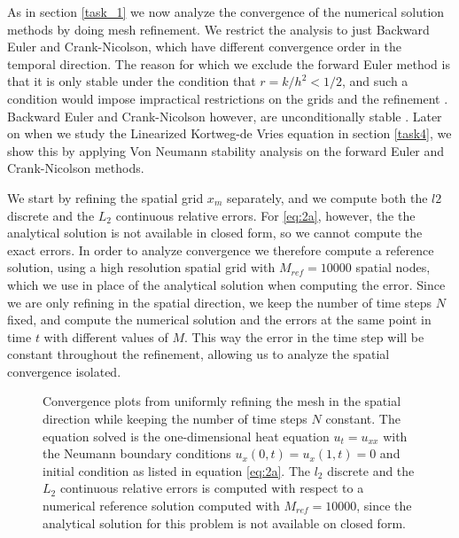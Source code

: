 As in section \ref{task_1} we now analyze the convergence of the numerical solution methods 
by doing mesh refinement. 
We restrict the analysis to just Backward Euler and Crank-Nicolson, 
which have different convergence order in the temporal direction. 
The reason for which we exclude the forward Euler method is that it is only stable under the condition that $r=k/h^2 < 1/2$, 
and such a condition would impose impractical restrictions on the grids and the refinement \cite{owren}. 
Backward Euler and Crank-Nicolson however, are unconditionally stable \cite{owren}. 
Later on when we study the Linearized Kortweg-de Vries equation in section \ref{task4}, 
we show this by applying Von Neumann stability analysis on the forward Euler and Crank-Nicolson methods. 

We start by refining the spatial grid $x_m$ separately, 
and we compute both the $l2$ discrete and the $L_2$ continuous relative errors. 
For \eqref{eq:2a}, however, the the analytical solution is not available in closed form, 
so we cannot compute the exact errors. 
In order to analyze convergence we therefore compute a reference solution, 
using a high resolution spatial grid with $M_{ref}=10000$ spatial nodes, 
which we use in place of the analytical solution when computing the error. 
Since we are only refining in the spatial direction, 
we keep the number of time steps $N$ fixed, 
and compute the numerical solution and the errors at the same point in time $t$ with different values of $M$. 
This way the error in the time step will be constant throughout the refinement, 
allowing us to analyze the spatial convergence isolated. 
\begin{figure}[ht]
    \centering
    
    \caption{
        Convergence plots from uniformly refining the mesh 
        in the spatial direction while keeping the number of time steps $N$ constant. 
        The equation solved is the one-dimensional heat equation $u_t=u_{xx}$ 
        with the Neumann boundary conditions $u_x(0,t) = u_x(1,t)=0$ and initial condition 
        as listed in equation \eqref{eq:2a}. 
        The $l_2$ discrete and the $L_2$ continuous relative errors is computed 
        with respect to a numerical reference solution computed with $M_{ref}=10000$, 
        since the analytical solution for this problem is not available on closed form. 
    }
    \label{fig:2a-convergence}
\end{figure}

